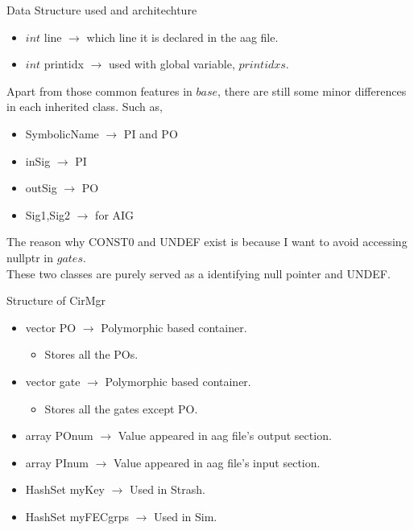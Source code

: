 \documentclass[12pt,a4paper]{report}
\begin{document}
\begin{section}{Data Structure used and architechture}
\begin{itemize}
  \item $int$ line $\rightarrow$ which line it is declared in the aag file.
  \item $int$ printidx $\rightarrow$ used with global variable, $printidxs$.
\end{itemize}
Apart from those common features in $base$, there are still some minor differences in each
inherited class. Such as,
\begin{itemize}
  \item SymbolicName $\rightarrow$ PI and PO
  \item inSig $\rightarrow$ PI
  \item outSig $\rightarrow$ PO
  \item Sig1,Sig2 $\rightarrow$ for AIG
\end{itemize}
The reason why CONST0 and UNDEF exist is because I want to avoid accessing nullptr in $gates$.\\
These two classes are purely served as a identifying null pointer and UNDEF.
\end{section}
\begin{section} {Structure of CirMgr}
\begin{itemize}
  \item vector PO $\rightarrow$ Polymorphic based container.
    \begin{itemize}
      \item Stores all the POs.
    \end{itemize}
  \item vector gate $\rightarrow$ Polymorphic based container.
  \begin{itemize}
    \item  Stores all the gates except PO.
  \end{itemize}
  \item array POnum $\rightarrow$ Value appeared in aag file's output section.
  \item array PInum $\rightarrow$ Value appeared in aag file's input section.
  \item HashSet myKey $\rightarrow$ Used in Strash.
  \item HashSet myFECgrps $\rightarrow$ Used in Sim.
\end{itemize}
\end{section}
\end{document}
